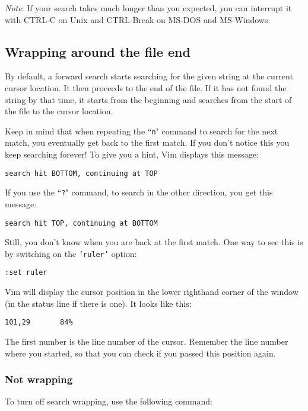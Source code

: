 \emph{Note}: If your search takes much longer than you expected, you can interrupt it with CTRL-C on Unix and  CTRL-Break on MS-DOS and MS-Windows.
\subsection{Wrapping around the file end}
By default, a forward search starts searching for the given string at the current cursor location.
It then proceeds to the end of the file.
If it has not found the string by that time, it starts from the beginning and searches from the start of the file to the cursor location.

Keep in mind that when repeating the ``\texttt{n}" command to search for the next match, you eventually get back to the first match.
If you don't notice this you keep searching forever!  To give you a hint, Vim displays this message:

\begin{Verbatim}[samepage=true]
    search hit BOTTOM, continuing at TOP 
\end{Verbatim}

If you use the ``\texttt{?}" command, to search in the other direction, you get this message:

\begin{Verbatim}[samepage=true]
    search hit TOP, continuing at BOTTOM 
\end{Verbatim}

Still, you don't know when you are back at the first match.
One way to see this is by switching on the \texttt{'ruler'} option:

\begin{Verbatim}[samepage=true]
 :set ruler
\end{Verbatim}

Vim will display the cursor position in the lower righthand corner of the window (in the status line if there is one).
It looks like this:

\begin{Verbatim}[samepage=true]
    101,29       84% 
\end{Verbatim}

The first number is the line number of the cursor.
Remember the line number where you started, so that you can check if you passed this position again.
\subsubsection{Not wrapping}
To turn off search wrapping, use the following command:


